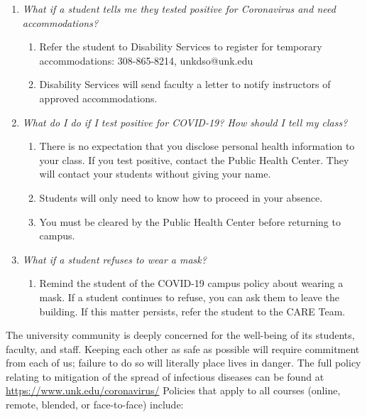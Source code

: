 \documentclass[12pt]{article}
\newcounter{ex}\setcounter{ex}{0}
\newcounter{cy}\setcounter{cy}{\the\year}
\begin{document}
\begin{enumerate}
\item \emph{What if a student tells me they tested positive for Coronavirus and need accommodations?}
\begin{enumerate}
\item	Refer the student to Disability Services to register for temporary accommodations: 308-865-8214, unkdso@unk.edu
\item 	Disability Services will send faculty a letter to notify instructors of approved accommodations.
\end{enumerate}

\item \emph{What do I do if I test positive for COVID-19? How should I tell my class?}
\begin{enumerate}
\item	There is no expectation that you disclose personal health information to your class.  If you test positive, contact the Public Health Center. They will contact your students without giving your name.
\item	Students will only need to know how to proceed in your absence.
\item	You must be cleared by the Public Health Center before returning to campus.
\end{enumerate}

\item \emph{What if a student refuses to wear a mask?}
\begin{enumerate}
\item	Remind the student of the COVID-19 campus policy about wearing a mask. If a student continues to refuse, you can ask them to leave the building. If this matter persists, refer the student to the CARE Team.
\end{enumerate}
\end{enumerate}
 The university community is deeply concerned for the well-being of its students, faculty, and staff. Keeping each other as safe as possible will require commitment from each of us; failure to do so will literally place lives in danger. The full policy relating to mitigation of the spread of infectious diseases can be found at \url{https://www.unk.edu/coronavirus/} Policies that apply to all courses (online, remote, blended, or face-to-face) include:
\end{document}
